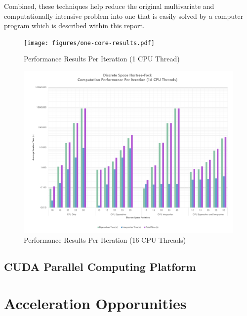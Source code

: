 \documentclass[journal, twoside]{IEEEtran}
\begin{document}
Combined, these techniques help reduce the original multivariate and computationally intensive problem into one that is easily solved by a computer program which is described within this report.

\lipsum[1]

\begin{figure}[h]
\centering
\texttt{[image: figures/one-core-results.pdf]}
\caption{Performance Results Per Iteration (1 CPU Thread)}
\label{perf-results-per-iteration-one-core}
\end{figure}

\begin{figure}[h]
\centering
\includegraphics[width=7in]{figures/sixteen-core-results.pdf}
\caption{Performance Results Per Iteration (16 CPU Threads)}
\label{perf-results-per-iteration-sixteen-core}
\end{figure}

\subsection{CUDA Parallel Computing Platform}


\cite{nvidia-cuda}
\lipsum[4]

\section{Acceleration Opporunities}

\lipsum[4]
\end{document}
